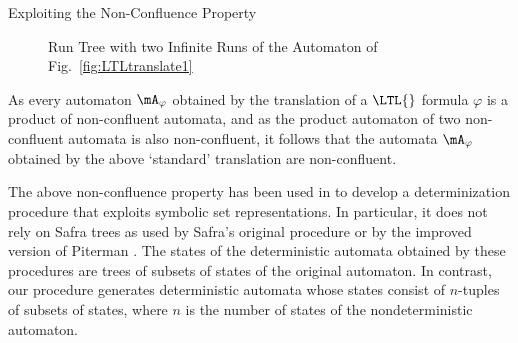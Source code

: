 \documentclass[copyright,creativecommons]{eptcs}
\begin{document}
\begin{section}{Exploiting the Non-Confluence Property}
\begin{figure}
\centering
{}
\caption{Run Tree with two Infinite Runs of the Automaton of Fig.~\ref{fig:LTLtranslate1}}
\label{LTL_Runtree2_fig}
\end{figure}


As every automaton $\mA_\varphi$ obtained by the translation of a $\LTL{}$ formula $\varphi$ is a product of non-confluent automata, and as the product automaton of two non-confluent automata is also non-confluent, it follows that the automata $\mA_\varphi$ obtained by the above `standard' translation are non-confluent.

The above non-confluence property has been used in \cite{MoSc08} to develop a determinization procedure that exploits symbolic set representations. In particular, it does not rely on Safra trees as used by Safra's original procedure \cite{Safr88} or by the improved version of Piterman \cite{Pite06}. The states of the deterministic automata obtained by these procedures are trees of subsets of states of the original automaton. In contrast, our procedure generates deterministic automata whose states consist of $n$-tuples of subsets of states, where $n$ is the number of states of the nondeterministic automaton.



\end{section}
\end{document}
